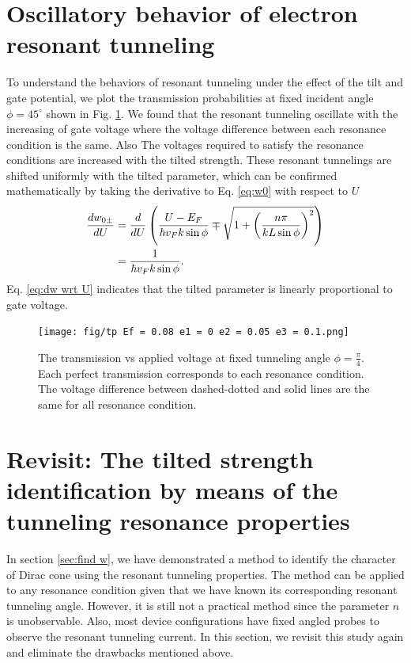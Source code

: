 \section{Oscillatory behavior of electron resonant tunneling} \label{sec:oscillation}
    To understand the behaviors of resonant tunneling under the effect of the tilt and gate potential, 
    we plot the transmission probabilities at fixed incident angle $\phi = 45^{\circ}$ shown in Fig. \ref{fig:tp 45 deg}.
    We found that the resonant tunneling oscillate with the increasing of gate voltage where the voltage difference between each resonance condition is the same.
    Also The voltages required to satisfy the resonance conditions are increased with the tilted strength.
    These resonant tunnelings are shifted uniformly with the tilted parameter, which can be confirmed mathematically by taking the derivative to Eq. \ref{eq:w0} with respect to $U$
    \begin{align} \label{eq:dw wrt U}
        \frac{d w_{0\pm}}{dU} &= \frac{d}{dU} \left(\frac{U-E_F}{\hbar v_F k \sin{\phi}}\mp \sqrt{1+\left(\frac{n \pi}{k L \sin{\phi}}\right)^2}\right) \notag \\
                              &= \frac{1}{\hbar v_F k \sin{\phi}}.
    \end{align}
    Eq. \ref{eq:dw wrt U} indicates that the tilted parameter is linearly proportional to gate voltage.
    \begin{figure}[H]
        \centering
            \texttt{[image: fig/tp Ef = 0.08 e1 = 0 e2 = 0.05 e3 = 0.1.png]}
            \caption{The transmission vs applied voltage at fixed tunneling angle $\phi = \frac{\pi}{4}$. 
                        Each perfect transmission corresponds to each resonance condition. 
                        The voltage difference between dashed-dotted and solid lines are the same for all resonance condition.}
        \label{fig:tp 45 deg}
    \end{figure}

\section{Revisit: The tilted strength identification by means of the tunneling resonance properties} \label{sec:find w 2}
    In section \ref{sec:find w}, we have demonstrated a method to identify the character of Dirac cone using the resonant tunneling properties.
    The method can be applied to any resonance condition given that we have known its corresponding resonant tunneling angle.
    However, it is still not a practical method since the parameter $n$ is unobservable.
    Also, most device configurations have fixed angled probes to observe the resonant tunneling current.
    In this section, we revisit this study again and eliminate the drawbacks mentioned above.\\
    
